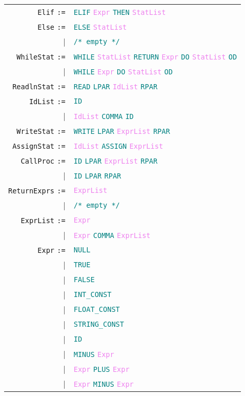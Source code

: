 \documentclass[a4paper,12pt]{article}
\newcommand\nonterm[1]{\texttt{\textcolor{violet}{#1}}}
\newcommand\term[1]{\texttt{\textcolor{teal}{#1}}}
\newcommand\production[1]{\texttt{#1} \texttt{:=}}
\newcommand\emptyprod{\texttt{\textcolor{teal}{/* empty */}}}
\begin{document}
    \begin{tabular}{rl}
   \production{Elif}			 & \term{ELIF} \nonterm{Expr} \term{THEN} \nonterm{StatList} \\
   \production{Else}   			 & \term{ELSE} \nonterm{StatList} \\
   						|& \emptyprod \\
   \production{WhileStat}             & \term{WHILE} \nonterm{StatList} \term{RETURN} \nonterm{Expr} \term{DO} \nonterm{StatList} \term{OD} \\
   						|& \term{WHILE} \nonterm{Expr} \term{DO} \nonterm{StatList} \term{OD} \\
  \production{ReadlnStat}           & \term{READ} \term{LPAR} \nonterm{IdList} \term{RPAR} \\
  \production{IdList}                    & \term{ID} \\
					        |& \nonterm{IdList} \term{COMMA} \term{ID} \\
  \production{WriteStat}              & \term{WRITE} \term{LPAR} \nonterm{ExprList} \term{RPAR} \\
  \production{AssignStat}           & \nonterm{IdList} \term{ASSIGN} \nonterm{ExprList} \\
  \production{CallProc}         & \term{ID} \term{LPAR} \nonterm{ExprList} \term{RPAR} \\
						|& \term{ID} \term{LPAR} \term{RPAR} \\
  \production{ReturnExprs}    & \nonterm{ExprList} \\
						 |& \emptyprod \\
	\production{ExprList}           & \nonterm{Expr} \\
						 |& \nonterm{Expr} \term{COMMA} \nonterm{ExprList} \\
   \production{Expr}                    & \term{NULL} \\
						|& \term{TRUE} \\
						|& \term{FALSE} \\
						|& \term{INT\_CONST} \\
						|& \term{FLOAT\_CONST} \\
						|& \term{STRING\_CONST} \\
						|& \term{ID} \\
    				                 |& \term{MINUS} \nonterm{Expr} \\
						|& \nonterm{Expr} \term{PLUS} \nonterm{Expr} \\
						|& \nonterm{Expr} \term{MINUS} \nonterm{Expr} \\ 

\end{tabular}
\end{document}
